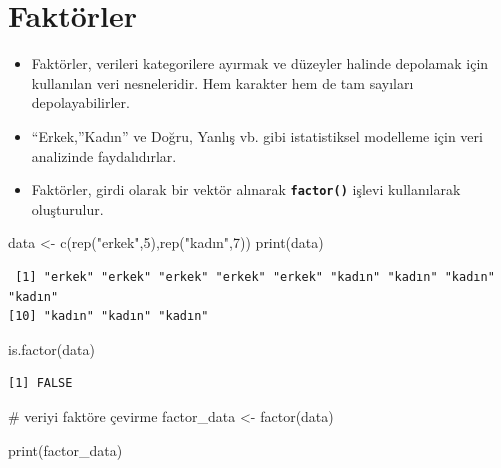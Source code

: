 \documentclass[
  letterpaper,
  DIV=11,
  numbers=noendperiod]{scrreprt}
\newenvironment{Shaded}{\begin{snugshade}}{\end{snugshade}}
\newcommand{\CommentTok}[1]{\textcolor[rgb]{0.37,0.37,0.37}{#1}}
\newcommand{\DecValTok}[1]{\textcolor[rgb]{0.68,0.00,0.00}{#1}}
\newcommand{\FunctionTok}[1]{\textcolor[rgb]{0.28,0.35,0.67}{#1}}
\newcommand{\NormalTok}[1]{\textcolor[rgb]{0.00,0.23,0.31}{#1}}
\newcommand{\OtherTok}[1]{\textcolor[rgb]{0.00,0.23,0.31}{#1}}
\newcommand{\StringTok}[1]{\textcolor[rgb]{0.13,0.47,0.30}{#1}}
\begin{document}
\hypertarget{faktuxf6rler}{%
\section{Faktörler}\label{faktuxf6rler}}

\begin{itemize}
\item
  Faktörler, verileri kategorilere ayırmak ve düzeyler halinde depolamak
  için kullanılan veri nesneleridir. Hem karakter hem de tam sayıları
  depolayabilirler.
\item
  ``Erkek,''Kadın'' ve Doğru, Yanlış vb. gibi istatistiksel modelleme
  için veri analizinde faydalıdırlar.
\item
  Faktörler, girdi olarak bir vektör alınarak \textbf{\texttt{factor()}}
  işlevi kullanılarak oluşturulur.
\end{itemize}

\begin{Shaded}
\begin{Highlighting}[]
\NormalTok{data }\OtherTok{\textless{}{-}} \FunctionTok{c}\NormalTok{(}\FunctionTok{rep}\NormalTok{(}\StringTok{"erkek"}\NormalTok{,}\DecValTok{5}\NormalTok{),}\FunctionTok{rep}\NormalTok{(}\StringTok{"kadın"}\NormalTok{,}\DecValTok{7}\NormalTok{))}
\FunctionTok{print}\NormalTok{(data)}
\end{Highlighting}
\end{Shaded}

\begin{verbatim}
 [1] "erkek" "erkek" "erkek" "erkek" "erkek" "kadın" "kadın" "kadın" "kadın"
[10] "kadın" "kadın" "kadın"
\end{verbatim}

\begin{Shaded}
\begin{Highlighting}[]
\FunctionTok{is.factor}\NormalTok{(data)}
\end{Highlighting}
\end{Shaded}

\begin{verbatim}
[1] FALSE
\end{verbatim}

\begin{Shaded}
\begin{Highlighting}[]
\CommentTok{\# veriyi faktöre çevirme}
\NormalTok{factor\_data }\OtherTok{\textless{}{-}} \FunctionTok{factor}\NormalTok{(data)}

\FunctionTok{print}\NormalTok{(factor\_data)}
\end{Highlighting}
\end{Shaded}
\end{document}
